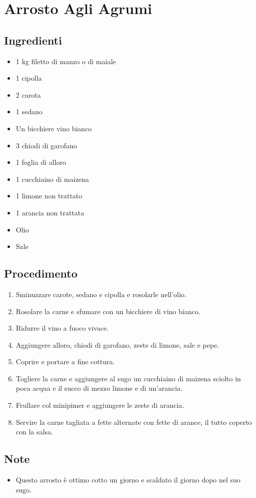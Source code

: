 \section{Arrosto Agli Agrumi}
\subsection{Ingredienti}
\begin{itemize}
\item 1 kg filetto di manzo o di maiale   
\item 1 cipolla  
\item 2 carota  
\item 1 sedano  
\item Un bicchiere vino bianco   
\item 3 chiodi di garofano  
\item 1 foglia di alloro  
\item 1 cucchiaino di maizena  
\item 1 limone non trattato  
\item 1 arancia non trattata  
\item Olio  
\item Sale
\end{itemize}
\subsection{Procedimento}
\begin{enumerate}
\item  Sminuzzare carote, sedano e cipolla e rosolarle nell'olio.  
\item  Rosolare la carne e sfumare con un bicchiere di vino bianco.  
\item  Ridurre il vino a fuoco vivace.  
\item  Aggiungere alloro, chiodi di garofano, zeste di limone, sale e pepe.  
\item  Coprire e portare a fine cottura.  
\item  Togliere la carne e aggiungere al sugo un cucchiaino di maizena sciolto in poca acqua e il succo di mezzo limone e di un'arancia.  
\item  Frullare col minipimer e aggiungere le zeste di arancia.  
\item  Servire la carne tagliata a fette alternate con fette di arance, il tutto coperto con la salsa.
\end{enumerate}
\subsection{Note}
\begin{itemize}
\item Questo arrosto è ottimo cotto un giorno e scaldato il giorno dopo nel suo sugo.
\end{itemize}
